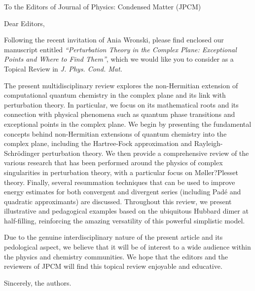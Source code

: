 \documentclass[10pt]{letter}
\begin{document}
\begin{letter}%
{To the Editors of Journal of Physics: Condensed Matter (JPCM)}

\opening{Dear Editors,}

\justifying
Following the recent invitation of Ania Wronski, please find enclosed our manuscript entitled \textit{``Perturbation Theory in the Complex Plane: Exceptional Points and Where to Find Them''}, which we would like you to consider as a Topical Review in \textit{J. Phys. Cond. Mat.}

The present multidisciplinary review explores the non-Hermitian extension of computational quantum chemistry in the complex plane and its link with perturbation theory.
In particular, we focus on its mathematical roots and its connection with physical phenomena such as quantum phase transitions and exceptional points in the complex plane.
We begin by presenting the fundamental concepts behind non-Hermitian extensions of quantum chemistry into the complex plane, including the Hartree-Fock approximation and
Rayleigh-Schr\"odinger perturbation theory. 
We then provide a comprehensive review of the various research that has been performed around the physics of complex singularities in perturbation theory, with a particular focus on M{\o}ller?Plesset theory.
Finally, several resummation techniques that can be used to improve energy estimates for both convergent and divergent series (including Pad\'e and quadratic approximants) are discussed. 
Throughout this review, we present illustrative and pedagogical examples based on the ubiquitous Hubbard dimer at half-filling, reinforcing the amazing versatility of this powerful simplistic model.

Due to the genuine interdisciplinary nature of the present article and its pedological aspect, we believe that it will be of interest to a wide audience within the physics and chemistry communities.
We hope that the editors and the reviewers of JPCM will find this topical review enjoyable and educative.

\closing{Sincerely, the authors.}


\end{letter}
\end{document}
